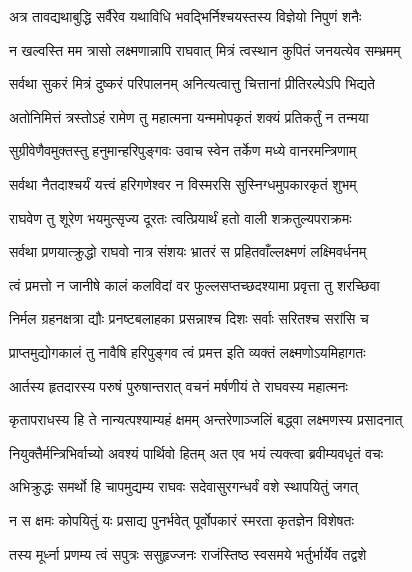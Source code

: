 \twolineshloka
{अत्र तावद्यथाबुद्धि सर्वैरेव यथाविधि}
{भवद्भिर्निश्चयस्तस्य विज्ञेयो निपुणं शनैः} %

\twolineshloka
{न खल्वस्ति मम त्रासो लक्ष्मणान्नापि राघवात्}
{मित्रं त्वस्थान कुपितं जनयत्येव सम्भ्रमम्} %

\twolineshloka
{सर्वथा सुकरं मित्रं दुष्करं परिपालनम्}
{अनित्यत्वात्तु चित्तानां प्रीतिरल्पेऽपि भिद्यते} %

\twolineshloka
{अतोनिमित्तं त्रस्तोऽहं रामेण तु महात्मना}
{यन्ममोपकृतं शक्यं प्रतिकर्तुं न तन्मया} %

\twolineshloka
{सुग्रीवेणैवमुक्तस्तु हनुमान्हरिपुङ्गवः}
{उवाच स्वेन तर्केण मध्ये वानरमन्त्रिणाम्} %

\twolineshloka
{सर्वथा नैतदाश्चर्यं यत्त्वं हरिगणेश्वर}
{न विस्मरसि सुस्निग्धमुपकारकृतं शुभम्} %

\twolineshloka
{राघवेण तु शूरेण भयमुत्सृज्य दूरतः}
{त्वत्प्रियार्थं हतो वाली शक्रतुल्यपराक्रमः} %

\twolineshloka
{सर्वथा प्रणयात्क्रुद्धो राघवो नात्र संशयः}
{भ्रातरं स प्रहितवाँल्लक्ष्मणं लक्ष्मिवर्धनम्} %

\twolineshloka
{त्वं प्रमत्तो न जानीषे कालं कलविदां वर}
{फुल्लसप्तच्छदश्यामा प्रवृत्ता तु शरच्छिवा} %

\twolineshloka
{निर्मल ग्रहनक्षत्रा द्यौः प्रनष्टबलाहका}
{प्रसन्नाश्च दिशः सर्वाः सरितश्च सरांसि च} %

\twolineshloka
{प्राप्तमुद्योगकालं तु नावैषि हरिपुङ्गव}
{त्वं प्रमत्त इति व्यक्तं लक्ष्मणोऽयमिहागतः} %

\twolineshloka
{आर्तस्य हृतदारस्य परुषं पुरुषान्तरात्}
{वचनं मर्षणीयं ते राघवस्य महात्मनः} %

\twolineshloka
{कृतापराधस्य हि ते नान्यत्पश्याम्यहं क्षमम्}
{अन्तरेणाञ्जलिं बद्ध्वा लक्ष्मणस्य प्रसादनात्} %

\twolineshloka
{नियुक्तैर्मन्त्रिभिर्वाच्यो अवश्यं पार्थिवो हितम्}
{अत एव भयं त्यक्त्वा ब्रवीम्यवधृतं वचः} %

\twolineshloka
{अभिक्रुद्धः समर्थो हि चापमुद्यम्य राघवः}
{सदेवासुरगन्धर्वं वशे स्थापयितुं जगत्} %

\twolineshloka
{न स क्षमः कोपयितुं यः प्रसाद्य पुनर्भवेत्}
{पूर्वोपकारं स्मरता कृतज्ञेन विशेषतः} %

\twolineshloka
{तस्य मूर्ध्ना प्रणम्य त्वं सपुत्रः ससुहृज्जनः}
{राजंस्तिष्ठ स्वसमये भर्तुर्भार्येव तद्वशे} %

